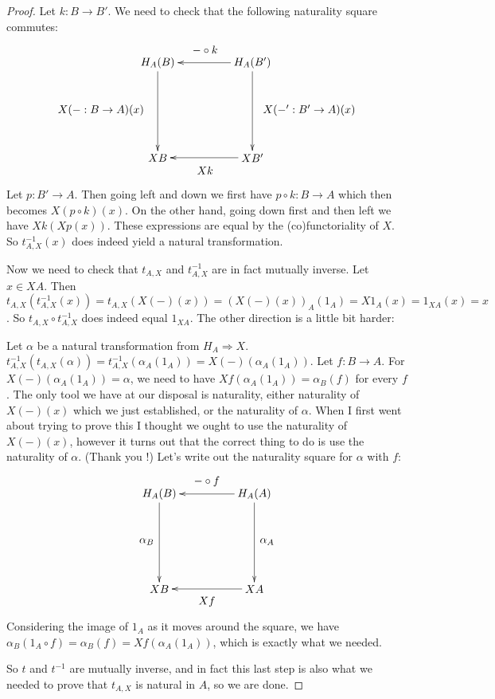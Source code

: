 \documentclass[11pt]{article}
\theoremstyle{definition}
\theoremstyle{definition}
\theoremstyle{plain}
\theoremstyle{plain}
\theoremstyle{plain}
\begin{document}
\begin{proof}
Let $k: B \to B'$. We need to check that the following naturality square commutes:

\begin{equation*}
\begin{xy}
(0,0)*+{H_A(B)}="v1"; (30,0)*+{H_A(B')}="v2"; (0,-30)*+{XB}="v3"; (30,-30)*+{XB'}="v4";
{\ar "v2";"v1"}?*!/^4mm/{- \circ k};
{\ar "v1";"v3"}?*!/^18mm/{X(-:B \to A)(x)};
{\ar "v2";"v4"}?*!/_18mm/{X(-':B' \to A)(x)};
{\ar "v4";"v3"}?*!/_4mm/{Xk};
\end{xy}
\end{equation*}

Let $p: B' \to A$. Then going left and down we first have $p \circ k: B \to A$ which then becomes $X(p \circ k)(x)$. On the other hand, going down first and then left we have $Xk(Xp(x))$. These expressions are equal by the (co)functoriality of $X$. So $t_{A,X}^{-1}(x)$ does indeed yield a natural transformation.

Now we need to check that $t_{A,X}$ and $t_{A,X}^{-1}$ are in fact mutually inverse. Let $x \in XA$. Then $t_{A,X}(t_{A,X}^{-1}(x)) = t_{A,X}(X(-)(x)) = (X(-)(x))_A(1_A) = X1_A(x) = 1_{XA}(x)=x$. So $t_{A,X} \circ t_{A,X}^{-1}$ does indeed equal $1_{XA}$. The other direction is a little bit harder:

Let $\alpha$ be a natural transformation from $H_A \Rightarrow X$. $t_{A,X}^{-1}(t_{A,X}(\alpha)) = t_{A,X}^{-1}(\alpha_A(1_A)) = X(-)(\alpha_A(1_A))$. Let $f: B \to A$. For $X(-)(\alpha_A(1_A)) = \alpha$, we need to have $Xf(\alpha_A(1_A)) = \alpha_B(f)$ for every $f$. The only tool we have at our disposal is naturality, either naturality of $X(-)(x)$ which we just established, or the naturality of $\alpha$. When I first went about trying to prove this I thought we ought to use the naturality of $X(-)(x)$, however it turns out that the correct thing to do is use the naturality of $\alpha$. (Thank you \cite{leinster_basic_2014}!) Let's write out the naturality square for $\alpha$ with $f$:

\begin{equation*}
\begin{xy}
(0,0)*+{H_A(B)}="v1"; (30,0)*+{H_A(A)}="v2"; (0,-30)*+{XB}="v3"; (30,-30)*+{XA}="v4";
{\ar "v2";"v1"}?*!/^4mm/{- \circ f};
{\ar "v1";"v3"}?*!/^4mm/{\alpha_B};
{\ar "v2";"v4"}?*!/_4mm/{\alpha_A};
{\ar "v4";"v3"}?*!/_4mm/{Xf};
\end{xy}
\end{equation*}

Considering the image of $1_A$ as it moves around the square, we have $\alpha_B(1_A \circ f) = \alpha_B(f) = Xf(\alpha_A(1_A))$, which is exactly what we needed.

So $t$ and $t^{-1}$ are mutually inverse, and in fact this last step is also what we needed to prove that $t_{A,X}$ is natural in $A$, so we are done.
\end{proof}

\nocite{*}


\end{document}
